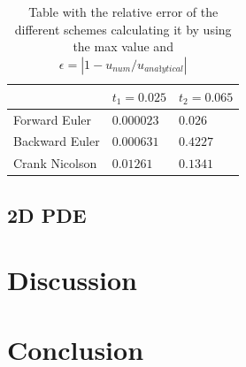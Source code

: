 \documentclass[a4paper,10pt]{article}
\begin{document}
\begin{table}
\centering
\caption{Table with the relative error of the different schemes calculating it by using the max value and $\epsilon =|1-u_{num}/u_{anałytical}|$ }
\label{tab:RelError}
\begin{tabular}{|l|l|l|}
\hline
 & $t_1=0.025$ & $t_2=0.065$ \\ \hline
Forward Euler & $0.000023$ & $0.026$ \\ \hline
Backward Euler & $0.000631$ & $0.4227$ \\ \hline
Crank Nicolson & $0.01261$  & $0.1341$ \\ \hline
\end{tabular}
\end{table}


\subsection{2D PDE}

\section{Discussion}

\section{Conclusion}
\end{document}

